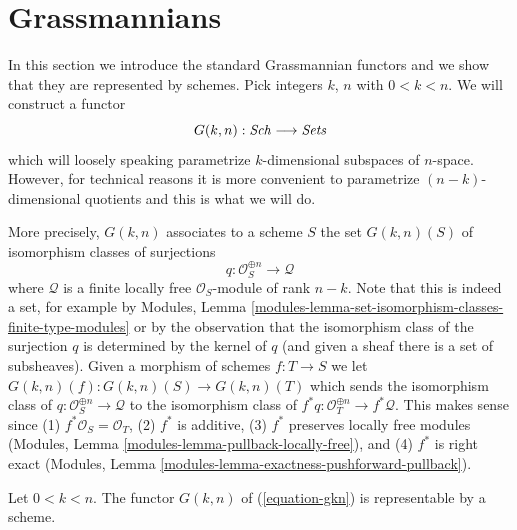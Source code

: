 \section{Grassmannians}
\label{section-grassmannian}

\noindent
In this section we introduce the standard Grassmannian functors and
we show that they are represented by schemes. Pick integers $k$, $n$
with $0 < k < n$. We will construct a functor
\begin{equation}
\label{equation-gkn}
G(k, n) : \mathit{Sch} \longrightarrow \textit{Sets}
\end{equation}
which will loosely speaking parametrize $k$-dimensional subspaces
of $n$-space. However, for technical reasons it is more convenient
to parametrize $(n - k)$-dimensional quotients and this is what we will
do.

\medskip\noindent
More precisely, $G(k, n)$ associates to a scheme $S$ the set $G(k, n)(S)$
of isomorphism classes of surjections
$$
q : \mathcal{O}_S^{\oplus n} \longrightarrow \mathcal{Q}
$$
where $\mathcal{Q}$ is a finite locally free $\mathcal{O}_S$-module
of rank $n - k$. Note that this is indeed a set, for example by
Modules, Lemma \ref{modules-lemma-set-isomorphism-classes-finite-type-modules}
or by the observation that the isomorphism class of the surjection $q$
is determined by the kernel of $q$ (and given a sheaf there is a set
of subsheaves). Given a morphism of schemes $f : T \to S$ we let
$G(k, n)(f) : G(k, n)(S) \to G(k, n)(T)$ which sends the
isomorphism class of $q : \mathcal{O}_S^{\oplus n} \longrightarrow \mathcal{Q}$
to the isomorphism class of
$f^*q : \mathcal{O}_T^{\oplus n} \longrightarrow f^*\mathcal{Q}$.
This makes sense since  (1) $f^*\mathcal{O}_S = \mathcal{O}_T$,
(2) $f^*$ is additive, (3) $f^*$ preserves locally free modules
(Modules, Lemma \ref{modules-lemma-pullback-locally-free}),
and (4) $f^*$ is right exact
(Modules, Lemma \ref{modules-lemma-exactness-pushforward-pullback}).

\begin{lemma}
\label{lemma-gkn-representable}
Let $0 < k < n$.
The functor $G(k, n)$ of (\ref{equation-gkn}) is representable by a scheme.
\end{lemma}

